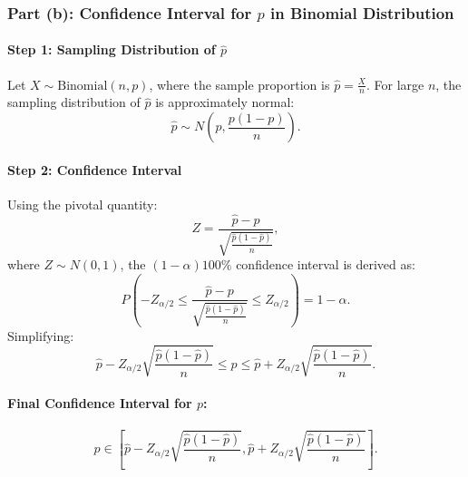 \documentclass{article}
\begin{document}
\subsubsection*{Part (b): Confidence Interval for \(p\) in Binomial Distribution}

\paragraph{Step 1: Sampling Distribution of \(\hat{p}\)}
Let \( X \sim \text{Binomial}(n, p) \), where the sample proportion is \( \hat{p} = \frac{X}{n} \). For large \(n\), the sampling distribution of \(\hat{p}\) is approximately normal:
\[
\hat{p} \sim N\left(p, \frac{p(1-p)}{n}\right).
\]

\paragraph{Step 2: Confidence Interval}
Using the pivotal quantity:
\[
Z = \frac{\hat{p} - p}{\sqrt{\frac{\hat{p}(1-\hat{p})}{n}}},
\]
where \( Z \sim N(0, 1) \), the \((1-\alpha)100\%\) confidence interval is derived as:
\[
P\left(-Z_{\alpha/2} \leq \frac{\hat{p} - p}{\sqrt{\frac{\hat{p}(1-\hat{p})}{n}}} \leq Z_{\alpha/2}\right) = 1-\alpha.
\]
Simplifying:
\[
\hat{p} - Z_{\alpha/2}\sqrt{\frac{\hat{p}(1-\hat{p})}{n}} \leq p \leq \hat{p} + Z_{\alpha/2}\sqrt{\frac{\hat{p}(1-\hat{p})}{n}}.
\]

\paragraph{Final Confidence Interval for \(p\):}
\[
p \in \left[\hat{p} - Z_{\alpha/2}\sqrt{\frac{\hat{p}(1-\hat{p})}{n}}, \hat{p} + Z_{\alpha/2}\sqrt{\frac{\hat{p}(1-\hat{p})}{n}}\right].
\]
\end{document}
